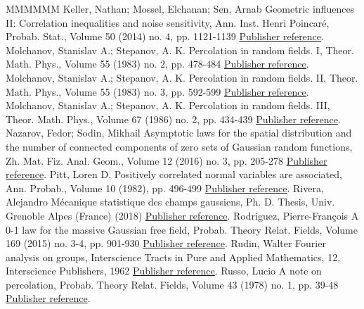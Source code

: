 \documentclass[11pt]{article}
\theoremstyle{definition}
\numberwithin{equation}{section}
\begin{document}
\begin{thebibliography}{MMMMMM}
 Keller, Nathan; Mossel, Elchanan; Sen, Arnab Geometric influences II: Correlation inequalities and noise sensitivity, Ann. Inst. Henri Poincaré, Probab. Stat., Volume 50 (2014) no. 4, pp. 1121-1139 \href{https://ahl.centre-mersenne.org/item/AHL_2020__3__169_0/#keller2014geometric}{Publisher reference}.
 Molchanov, Stanislav A.; Stepanov, A. K. Percolation in random fields. I, Theor. Math. Phys., Volume 55 (1983) no. 2, pp. 478-484 \href{https://ahl.centre-mersenne.org/item/AHL_2020__3__169_0/#molchanov1983percolationi}{Publisher reference}.
 Molchanov, Stanislav A.; Stepanov, A. K. Percolation in random fields. II, Theor. Math. Phys., Volume 55 (1983) no. 3, pp. 592-599 \href{https://ahl.centre-mersenne.org/item/AHL_2020__3__169_0/#molchanov1983percolationii}{Publisher reference}.
 Molchanov, Stanislav A.; Stepanov, A. K. Percolation in random fields. III, Theor. Math. Phys., Volume 67 (1986) no. 2, pp. 434-439 \href{https://ahl.centre-mersenne.org/item/AHL_2020__3__169_0/#molchanov1986percolationiii}{Publisher reference}.
 Nazarov, Fedor; Sodin, Mikhail Asymptotic laws for the spatial distribution and the number of connected components of zero sets of Gaussian random functions, Zh. Mat. Fiz. Anal. Geom., Volume 12 (2016) no. 3, pp. 205-278 \href{https://ahl.centre-mersenne.org/item/AHL_2020__3__169_0/#nazarov2015asymptotic}{Publisher reference}.
 Pitt, Loren D. Positively correlated normal variables are associated, Ann. Probab., Volume 10 (1982), pp. 496-499 \href{https://ahl.centre-mersenne.org/item/AHL_2020__3__169_0/#pitt1982positively}{Publisher reference}.
 Rivera, Alejandro Mécanique statistique des champs gaussiens, Ph. D. Thesis, Univ. Grenoble Alpes (France) (2018) \href{https://ahl.centre-mersenne.org/item/AHL_2020__3__169_0/#alelele}{Publisher reference}.
 Rodriguez, Pierre-François A 0-1 law for the massive Gaussian free field, Probab. Theory Relat. Fields, Volume 169 (2015) no. 3-4, pp. 901-930 \href{https://ahl.centre-mersenne.org/item/AHL_2020__3__169_0/#rodriguez20150}{Publisher reference}.
 Rudin, Walter Fourier analysis on groups, Interscience Tracts in Pure and Applied Mathematics, 12, Interscience Publishers, 1962 \href{https://ahl.centre-mersenne.org/item/AHL_2020__3__169_0/#rud_fou}{Publisher reference}.
 Russo, Lucio A note on percolation, Probab. Theory Relat. Fields, Volume 43 (1978) no. 1, pp. 39-48 \href{https://ahl.centre-mersenne.org/item/AHL_2020__3__169_0/#russo1978note}{Publisher reference}.

\end{thebibliography}
\end{document}
